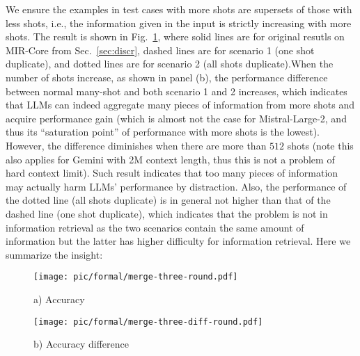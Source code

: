 We ensure the examples in test cases with more shots are supersets of those with less shots, i.e., the information given in the input is strictly increasing with more shots. The result is shown in Fig.~\ref{fig:ablation_dup}, where solid lines are for original resutls on MIR-Core from Sec.~\ref{sec:discr}, dashed lines are for scenario 1 (one shot duplicate), and dotted lines are for scenario 2 (all shots duplicate).When the number of shots increase, as shown in panel (b), the performance difference between normal many-shot and both scenario 1 and 2 increases, which indicates that LLMs can indeed aggregate many pieces of information from more shots and acquire performance gain (which is almost not the case for Mistral-Large-2, and thus its ``saturation point'' of performance with more shots is the lowest). However, the difference diminishes when there are more than $512$ shots (note this also applies for Gemini with 2M context length, thus this is not a problem of hard context limit). Such result indicates that too many pieces of information may actually harm LLMs' performance by distraction. Also, the performance of the dotted line (all shots duplicate) is in general not higher than that of the dashed line (one shot duplicate), which indicates that the problem is not in information retrieval as the two scenarios contain the same amount of information but the latter has higher difficulty for information retrieval. Here we summarize the insight:


\begin{figure}[ht]
    \centering
    \begin{minipage}{0.48\linewidth}
        \centering
        \texttt{[image: pic/formal/merge-three-round.pdf]}
        \caption*{a) Accuracy}
    \end{minipage}
    \begin{minipage}{0.48\linewidth}
       \centering
        \texttt{[image: pic/formal/merge-three-diff-round.pdf]}
        \caption*{b) Accuracy difference}
        \end{minipage}
        \label{fig:ablation_dup}
\end{figure}



